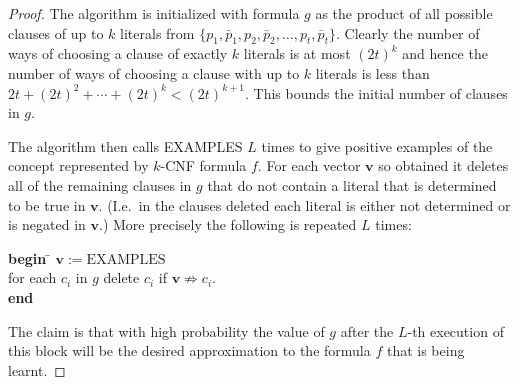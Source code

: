 \begin{proof}
The algorithm is initialized with formula $g$ as the product of all
possible clauses of up to $k$ literals from
$\{p_1, \bar{p}_1, p_2, \bar{p}_2, \ldots, p_t, \bar{p}_t\}$.
Clearly the number of ways of choosing a clause of exactly $k$
literals is at most $(2t)^k$ and hence the number of ways of choosing
a clause with up to $k$ literals is less than
$2t + (2t)^2 + \cdots + (2t)^k < (2t)^{k+1}$. This bounds the
initial number of clauses in $g$.

The algorithm then calls EXAMPLES $L$ times to give positive examples
of the concept represented by $k$-CNF formula $f$. For each vector
$\mathbf{v}$ so obtained it deletes all of the remaining clauses in
$g$ that do not contain a literal that is determined to be true in
$\mathbf{v}$. (I.e.\ in the clauses deleted each literal is either
not determined or is negated in $\mathbf{v}$.) More precisely the
following is repeated $L$ times:

\begin{tabbing}
\textbf{begin} \= $\mathbf{v} := \text{EXAMPLES}$ \\
\> for each $c_i$ in $g$ delete $c_i$ if $\mathbf{v} \not\Rightarrow c_i$. \\
\textbf{end}
\end{tabbing}

The claim is that with high probability the value of $g$ after the
$L$-th execution of this block will be the desired approximation to
the formula $f$ that is being learnt.


\end{proof}
